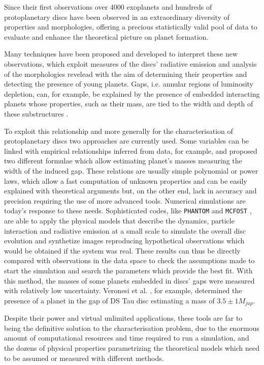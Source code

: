 \documentclass[a4paper,10pt]{report}
\begin{document}
Since their first observations over 4000 exoplanets and hundreds of protoplanetary discs have been observed in an extraordinary 
diversity of properties and morphologies, 
offering a precious statistically valid pool of data to evaluate and enhance
the theoretical picture on planet formation.

Many techniques have been proposed and developed to interpret these new observations,
which exploit measures of the discs' radiative emission and analysis of the morphologies revelead
with the aim of determining their properties and detecting the presence of young planets.
Gaps, i.e. annular regions of luminosity depletion, can, for example, be explained 
by the presence of embedded interacting planets whose properties, such as their mass, are
tied to the width and depth of these substructures \citep{gap_opening1,gap_opening2,gap_opening3}.

To exploit this relationship and more generally for the characterisation of protoplanetary discs
two approaches are currently used. Some variables can be linked with empirical relationships 
inferred from data,
for example, \citet{Lodato_2019} and \citet{kanagawa} proposed 
two different formulae which allow estimating planet's masses measuring
the width of the induced gap. These relations are usually simple polynomial or power laws, which 
allow a fast computation of unknown properties and can be easily explained with theoretical
arguments but, on the other end,
lack in accuracy and precision requiring the use of more advanced tools.
Numerical simulations are today's response to these needs. Sophisticated codes,
 like \lstinline{PHANTOM} \citep{phantom} and \lstinline{MCFOST} \citep{mcfost1,mcfost2}, 
are able to apply the physical models that describe the dynamics, particle interaction and radiative emission at a small scale 
to simulate the overall disc evolution and synthetize images reproducing hypothetical observations which would be 
obtained if the system was real.
These results can thus be directly compared  with observations in the data 
space to check the assumptions made to start the simulation and 
search the parameters which provide the best fit. With this method, the masses of some planets embedded 
in discs' gaps were measured with relatively low uncertainty. Veronesi et al. \cite{dstauv}, for example, determined the
presence of a planet in the gap of DS Tau disc estimating a mass of $3.5 \pm 1 M_{jup}$.

Despite their power and virtual unlimited applications, these tools are far to being the definitive solution
to the characterisation problem, due to the enormous amount of computational resources and time 
required to run a simulation, and the dozens of physical properties parametrizing the theoretical models which need to be 
assumed or measured with different methods.
\end{document}
